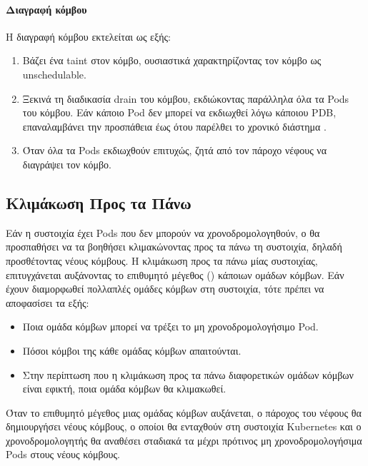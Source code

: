 \paragraph*{Διαγραφή κόμβου}

Η διαγραφή κόμβου εκτελείται ως εξής:
\begin{enumerate}
      \tightlist
      \item Βάζει ένα taint   στον
            κόμβο, ουσιαστικά χαρακτηρίζοντας τον κόμβο ως unschedulable.
      \item Ξεκινά τη διαδικασία drain του κόμβου, εκδιώκοντας παράλληλα όλα τα
            Pods του κόμβου. Εάν κάποιο Pod δεν μπορεί να εκδιωχθεί λόγω κάποιου
            PDB, επαναλαμβάνει την προσπάθεια έως ότου παρέλθει το χρονικό
            διάστημα .
      \item Όταν όλα τα Pods εκδιωχθούν επιτυχώς, ζητά από τον πάροχο νέφους
            να διαγράψει τον κόμβο.
\end{enumerate}

\subsection{Κλιμάκωση Προς τα Πάνω}

Εάν η συστοιχία έχει Pods που δεν μπορούν να χρονοδρομολογηθούν, ο  θα προσπαθήσει να τα βοηθήσει κλιμακώνοντας προς τα πάνω τη
      συστοιχία, δηλαδή προσθέτοντας νέους κόμβους. Η κλιμάκωση προς τα πάνω
      μίας συστοιχίας, επιτυγχάνεται αυξάνοντας το επιθυμητό μέγεθος
      () κάποιων ομάδων κόμβων. Εάν έχουν διαμορφωθεί πολλαπλές
      ομάδες κόμβων στη συστοιχία, τότε πρέπει να αποφασίσει τα εξής:
\begin{itemize}
      \tightlist
      \item Ποια ομάδα κόμβων μπορεί να τρέξει το μη χρονοδρομολογήσιμο Pod.
      \item Πόσοι κόμβοι της κάθε ομάδας κόμβων απαιτούνται.
      \item Στην περίπτωση που η κλιμάκωση προς τα πάνω διαφορετικών ομάδων
            κόμβων είναι εφικτή, ποια ομάδα κόμβων θα κλιμακωθεί.
\end{itemize}

Όταν το επιθυμητό μέγεθος μιας ομάδας κόμβων αυξάνεται, ο πάροχος του νέφους θα
δημιουργήσει νέους κόμβους, ο οποίοι θα ενταχθούν στη συστοιχία Kubernetes και ο
χρονοδρομολογητής θα αναθέσει σταδιακά τα μέχρι πρότινος μη χρονοδρομολογήσιμα
Pods στους νέους κόμβους.

